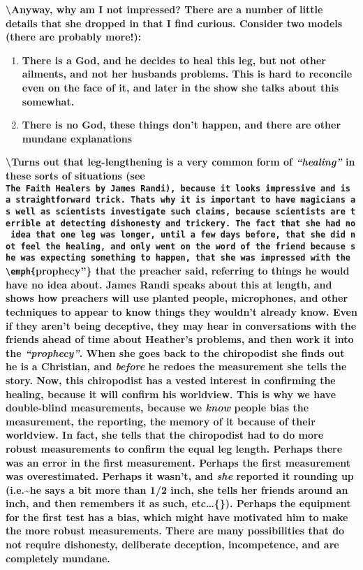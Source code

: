 \documentclass{tufte-book}
\begin{document}
\textbf{\textbackslash{}Anyway, why am I not impressed? There are a
number of little details that she dropped in that I find curious.
Consider two models (there are probably more!):}

\begin{enumerate}
\def\labelenumi{\arabic{enumi}.}
\itemsep1pt\parskip0pt
\item
  \textbf{There is a God, and he decides to heal this leg, but not other
  ailments, and not her husbands problems. This is hard to reconcile
  even on the face of it, and later in the show she talks about this
  somewhat.}
\item
  \textbf{There is no God, these things don't happen, and there are
  other mundane explanations}
\end{enumerate}

\textbf{\textbackslash{}Turns out that leg-lengthening is a very common
form of \emph{``healing''} in these sorts of situations (see
\texttt{The\ Faith\ Healers\textquotesingle{}\textquotesingle{}\ by\ James\ Randi),\ because\ it\ looks\ impressive\ and\ is\ a\ straightforward\ trick.\ That\textquotesingle{}s\ why\ it\ is\ important\ to\ have\ magicians\ as\ well\ as\ scientists\ investigate\ such\ claims,\ because\ scientists\ are\ terrible\ at\ detecting\ dishonesty\ and\ trickery.\ The\ fact\ that\ she\ had\ no\ idea\ that\ one\ leg\ was\ longer,\ until\ a\ few\ days\ before,\ that\ she\ did\ not\ feel\ the\ healing,\ and\ only\ went\ on\ the\ word\ of\ the\ friend\ because\ she\ was\ expecting\ something\ to\ happen,\ that\ she\ was\ impressed\ with\ the\ \textbackslash{}emph\{}prophecy''\}
that the preacher said, referring to things he would have no idea about.
James Randi speaks about this at length, and shows how preachers will
use planted people, microphones, and other techniques to appear to know
things they wouldn't already know. Even if they aren't being deceptive,
they may hear in conversations with the friends ahead of time about
Heather's problems, and then work it into the \emph{``prophecy''}. When
she goes back to the chiropodist she finds out he is a Christian, and
\emph{before} he redoes the measurement she tells the story. Now, this
chiropodist has a vested interest in confirming the healing, because it
will confirm his worldview. This is why we have double-blind
measurements, because we \emph{know} people bias the measurement, the
reporting, the memory of it because of their worldview. In fact, she
tells that the chiropodist had to do more robust measurements to confirm
the equal leg length. Perhaps there was an error in the first
measurement. Perhaps the first measurement was overestimated. Perhaps it
wasn't, and \emph{she} reported it rounding up (i.e.\textasciitilde{}he
says a bit more than 1/2 inch, she tells her friends around an inch, and
then remembers it as such, etc\ldots\{\}). Perhaps the equipment for the
first test has a bias, which might have motivated him to make the more
robust measurements. There are many possibilities that do not require
dishonesty, deliberate deception, incompetence, and are completely
mundane.}
\end{document}
